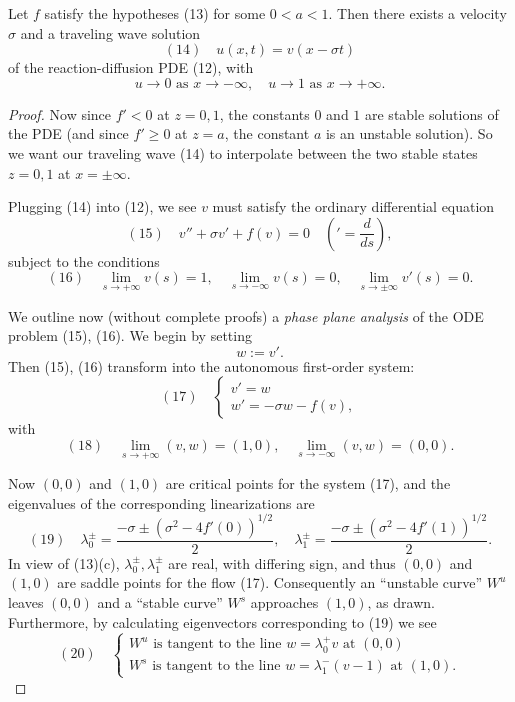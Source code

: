 \begin{theorem}
\label{thm:bistable-traveling-wave-existence}
Let $f$ satisfy the hypotheses (13) for some $0 < a < 1$. Then there exists a velocity $\sigma$ and a traveling wave solution
$$
(14) \quad u(x,t) = v(x - \sigma t)
$$
of the reaction-diffusion PDE (12), with
$$u \to 0 \text{ as } x \to -\infty, \quad u \to 1 \text{ as } x \to +\infty.$$
\end{theorem}
\begin{proof}
Now since $f' < 0$ at $z = 0, 1$, the constants $0$ and $1$ are stable solutions of the PDE (and since $f' \geq 0$ at $z = a$, the constant $a$ is an unstable solution). So we want our traveling wave (14) to interpolate between the two stable states $z = 0, 1$ at $x = \pm\infty$.

Plugging (14) into (12), we see $v$ must satisfy the ordinary differential equation
$$
(15) \quad v'' + \sigma v' + f(v) = 0 \quad \left(' = \frac{d}{ds}\right),
$$
subject to the conditions
$$
(16) \quad \lim_{s \to +\infty} v(s) = 1, \quad \lim_{s \to -\infty} v(s) = 0, \quad \lim_{s \to \pm\infty} v'(s) = 0.
$$

We outline now (without complete proofs) a \textit{phase plane analysis} of the ODE problem (15), (16). We begin by setting
$$w := v'.$$
Then (15), (16) transform into the autonomous first-order system:
$$
(17) \quad \begin{cases}
v' = w \\
w' = -\sigma w - f(v),
\end{cases}
$$
with
$$
(18) \quad \lim_{s \to +\infty} (v, w) = (1, 0), \quad \lim_{s \to -\infty} (v, w) = (0, 0).
$$

Now $(0,0)$ and $(1,0)$ are critical points for the system (17), and the eigenvalues of the corresponding linearizations are
$$(19) \quad \lambda_0^{\pm} = \frac{-\sigma \pm (\sigma^2 - 4f'(0))^{1/2}}{2}, \quad \lambda_1^{\pm} = \frac{-\sigma \pm (\sigma^2 - 4f'(1))^{1/2}}{2}.$$
In view of (13)(c), $\lambda_0^{\pm}, \lambda_1^{\pm}$ are real, with differing sign, and thus $(0,0)$ and $(1,0)$ are saddle points for the flow (17). Consequently an ``unstable curve'' $W^u$ leaves $(0,0)$ and a ``stable curve'' $W^s$ approaches $(1,0)$, as drawn. Furthermore, by calculating eigenvectors corresponding to (19) we see
$$(20) \quad \begin{cases} W^u \text{ is tangent to the line } w = \lambda_0^+ v \text{ at } (0,0) \\ W^s \text{ is tangent to the line } w = \lambda_1^-(v-1) \text{ at } (1,0). \end{cases}$$


\end{proof}
